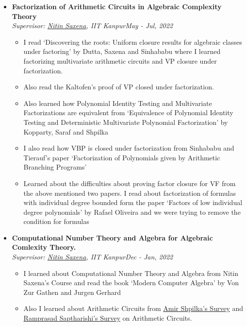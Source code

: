 \documentclass[10pt,a4paper,sans,colorlinks]{moderncv}        %
\newcommand{\heading}[2]{
	\hspace{0pt}#1\hfill#2\\
}
\newcommand{\headingBf}[2]{
	\heading{\textbf{#1}}{\textbf{#2}}
}
\newcommand{\headingIt}[2]{
	\heading{\textit{#1}}{\textit{#2}}
}
\begin{document}
\begin{itemize}
	
	\item \headingBf{Factorization of Arithmetic Circuits in Algebraic Complexity Theory}{}
	\headingIt{Supervisor: \href{https://www.cse.iitk.ac.in/users/nitin/}{Nitin Saxena}, IIT Kanpur}{May - Jul, 2022}
	\begin{itemize}
		\item I read `Discovering the roots: Uniform closure results for algebraic classes under factoring' by Dutta, Saxena and Sinhababu  where I learned factorizing multivariate arithmetic circuits and \textsc{VP} closure under factorization. 
		\item  Also read the Kaltofen's proof of \textsc{VP} closed under factorization.
		\item Also learned how Polynomial Identity Testing and Multivariate Factorizations are equivalent from `Equivalence of Polynomial Identity Testing and Deterministic Multivariate Polynomial Factorization' by  Kopparty, Saraf and Shpilka
		\item I also read how \textsc{VBP} is closed under factorization from  Sinhababu and Tierauf's paper `Factorization of Polynomials given by Arithmetic Branching Programs'
		\item Learned about the difficulties about proving factor closure for \textsc{VF} from the above mentioned two papers. I read about factorization of formulas with individual degree bounded form the paper `Factors of low individual degree polynomials' by Rafael Oliveira and we were trying to remove the condition for formulas
	\end{itemize}
	
	
	\item \headingBf{Computational Number Theory and Algebra for Algebraic Comlexity Theory.}{}
	\headingIt{Supervisor: \href{https://www.cse.iitk.ac.in/users/nitin/}{Nitin Saxena}, IIT Kanpur}{Dec - Jan, 2022}
	\begin{itemize}
		\item I learned about Computational Number Theory and Algebra from Nitin Saxena's Course and read the book `Modern Computer Algebra' by Von Zur Gathen and Jurgen Gerhard
		\item Also I learned about Arithmetic Circuits from \href{https://www.nowpublishers.com/article/Details/TCS-039}{Amir Shpilka's Survey} and 
		\href{https://github.com/dasarpmar/lowerbounds-survey}{Ramprasad Saptharishi's Survey} on Arithmetic Circuits.
	\end{itemize}
\end{itemize}
\end{document}
